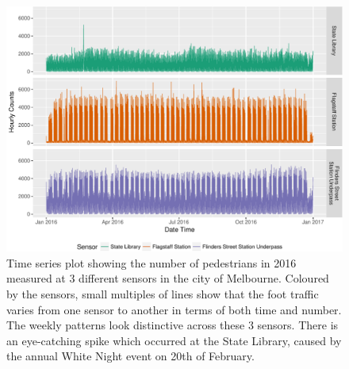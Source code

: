 \documentclass[article]{jss}
\theoremstyle{definition}
\theoremstyle{definition}
\theoremstyle{remark}
\begin{document}
\begin{CodeChunk}
\begin{figure}

{\centering \includegraphics[width=\textwidth]{figure/time-series-plot-1} 

}

\caption[Time series plot showing the number of
pedestrians in 2016 measured at 3 different sensors in the city of
Melbourne. Coloured by the sensors, small multiples of lines show that
the foot traffic varies from one sensor to another in terms of both time
and number. The weekly patterns look distinctive across these 3 sensors.
There is an eye-catching spike which occurred at the State Library,
caused by the annual White Night event on 20th of February.]{Time series plot showing the number of
pedestrians in 2016 measured at 3 different sensors in the city of
Melbourne. Coloured by the sensors, small multiples of lines show that
the foot traffic varies from one sensor to another in terms of both time
and number. The weekly patterns look distinctive across these 3 sensors.
There is an eye-catching spike which occurred at the State Library,
caused by the annual White Night event on 20th of February.}\label{fig:time-series-plot}
\end{figure}
\end{CodeChunk}
\end{document}
